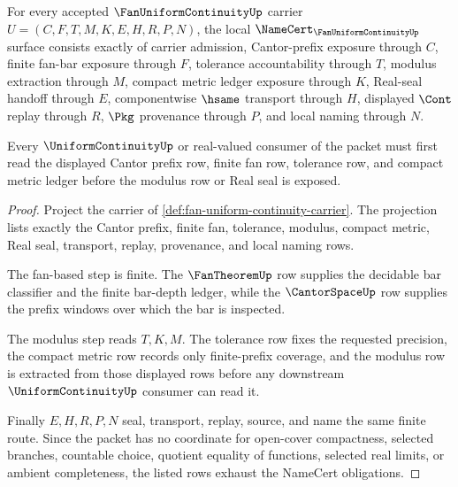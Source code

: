 \begin{theorem}
\label{thm:fan-uniform-continuity-namecert-obligations}
For every accepted $\FanUniformContinuityUp$ carrier $U=(C,F,T,M,K,E,H,R,P,N)$, the local $\NameCert_{\FanUniformContinuityUp}$ surface consists exactly of carrier admission, Cantor-prefix exposure through $C$, finite fan-bar exposure through $F$, tolerance accountability through $T$, modulus extraction through $M$, compact metric ledger exposure through $K$, Real-seal handoff through $E$, componentwise $\hsame$ transport through $H$, displayed $\Cont$ replay through $R$, $\Pkg$ provenance through $P$, and local naming through $N$.

Every $\UniformContinuityUp$ or real-valued consumer of the packet must first read the displayed Cantor prefix row, finite fan row, tolerance row, and compact metric ledger before the modulus row or Real seal is exposed.
\end{theorem}
\begin{proof}
Project the carrier of \autoref{def:fan-uniform-continuity-carrier}. The projection lists exactly the Cantor prefix, finite fan, tolerance, modulus, compact metric, Real seal, transport, replay, provenance, and local naming rows.

The fan-based step is finite. The $\FanTheoremUp$ row supplies the decidable bar classifier and the finite bar-depth ledger, while the $\CantorSpaceUp$ row supplies the prefix windows over which the bar is inspected.

The modulus step reads $T,K,M$. The tolerance row fixes the requested precision, the compact metric row records only finite-prefix coverage, and the modulus row is extracted from those displayed rows before any downstream $\UniformContinuityUp$ consumer can read it.

Finally $E,H,R,P,N$ seal, transport, replay, source, and name the same finite route. Since the packet has no coordinate for open-cover compactness, selected branches, countable choice, quotient equality of functions, selected real limits, or ambient completeness, the listed rows exhaust the NameCert obligations.
\end{proof}


